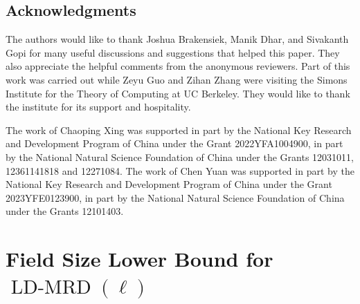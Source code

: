 \documentclass[11pt]{article}
\newif\ifmynotes
\newcommand{\ZGnote}[1]{\ifmynotes\textcolor{purple}{[Zeyu: #1]}\else\fi}
\newcommand{\CYnote}[1]{\ifmynotes\textcolor{orange}{[Chen: #1]}\else\fi}
\theoremstyle{plain}
\theoremstyle{definition}
\theoremstyle{remark}
\newcommand{\F}{\mathbb{F}}
\renewcommand{\epsilon}{\varepsilon}
\begin{document}




\subsection*{Acknowledgments} 
The authors would like to thank Joshua Brakensiek, Manik Dhar, and Sivakanth Gopi for many useful discussions and suggestions that helped this paper. They also appreciate the helpful comments from the anonymous reviewers.
Part of this work was carried out while Zeyu Guo and Zihan Zhang were visiting the Simons Institute for the Theory of Computing at UC Berkeley. They would like to thank the institute for its support and hospitality.

The work of Chaoping Xing was supported in part by the National Key Research and Development Program of China under the Grant 2022YFA1004900, in part by the National Natural Science Foundation of China under the Grants 12031011, 12361141818 and 12271084. The work of Chen Yuan was supported in part by the National Key Research and Development Program of China under the Grant 2023YFE0123900, in part by the National Natural Science Foundation of China under the Grants 12101403.





\appendix
\section{Field Size Lower Bound for $\operatorname{LD-MRD}(\ell)$}
\end{document}

